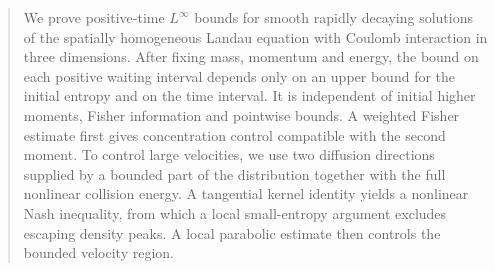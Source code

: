 \begin{abstract}
We prove positive-time $L^\infty$ bounds for smooth rapidly decaying solutions of the spatially homogeneous Landau equation with Coulomb interaction in three dimensions. After fixing mass, momentum and energy, the bound on each positive waiting interval depends only on an upper bound for the initial entropy and on the time interval. It is independent of initial higher moments, Fisher information and pointwise bounds. A weighted Fisher estimate first gives concentration control compatible with the second moment. To control large velocities, we use two diffusion directions supplied by a bounded part of the distribution together with the full nonlinear collision energy. A tangential kernel identity yields a nonlinear Nash inequality, from which a local small-entropy argument excludes escaping density peaks. A local parabolic estimate then controls the bounded velocity region.
\end{abstract}
